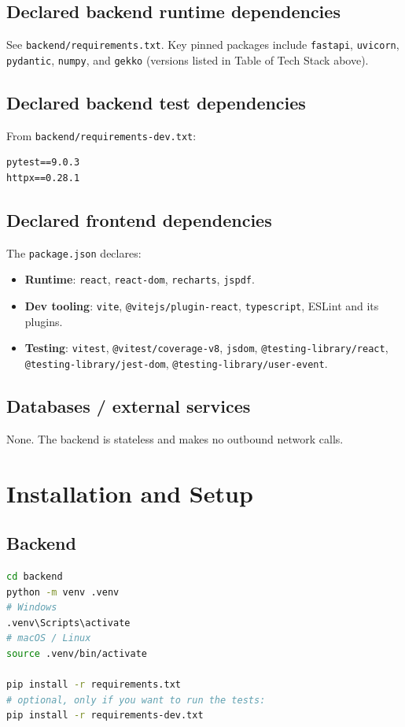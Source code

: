 \documentclass[11pt,a4paper]{article}
\begin{document}
\subsection{Declared backend runtime dependencies}
See \texttt{backend/requirements.txt}. Key pinned packages include
\texttt{fastapi}, \texttt{uvicorn}, \texttt{pydantic}, \texttt{numpy}, and
\texttt{gekko} (versions listed in Table of Tech Stack above).

\subsection{Declared backend test dependencies}
From \texttt{backend/requirements-dev.txt}:

\begin{lstlisting}
pytest==9.0.3
httpx==0.28.1
\end{lstlisting}

\subsection{Declared frontend dependencies}
The \texttt{package.json} declares:

\begin{itemize}[leftmargin=1.2em]
  \item \textbf{Runtime}: \texttt{react}, \texttt{react-dom}, \texttt{recharts},
        \texttt{jspdf}.
  \item \textbf{Dev tooling}: \texttt{vite}, \texttt{@vitejs/plugin-react},
        \texttt{typescript}, ESLint and its plugins.
  \item \textbf{Testing}: \texttt{vitest},
        \texttt{@vitest/coverage-v8}, \texttt{jsdom},
        \texttt{@testing-library/react}, \texttt{@testing-library/jest-dom},
        \texttt{@testing-library/user-event}.
\end{itemize}

\subsection{Databases / external services}
None. The backend is stateless and makes no outbound network calls.

\section{Installation and Setup}
\label{sec:install}

\subsection{Backend}
\begin{lstlisting}[language=bash]
cd backend
python -m venv .venv
# Windows
.venv\Scripts\activate
# macOS / Linux
source .venv/bin/activate

pip install -r requirements.txt
# optional, only if you want to run the tests:
pip install -r requirements-dev.txt
\end{lstlisting}
\end{document}
